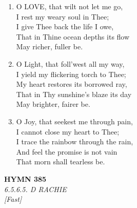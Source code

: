 \documentclass[11pt,a4paper]{article}
\begin{document}
\begin{enumerate}
    \item O LOVE, that wilt not let me go, \\
        I rest my weary soul in Thee; \\
        I give Thee back the life I owe, \\
        That in Thine ocean depths its flow \\
        May richer, fuller be.

    \item O Light, that foll'west all my way, \\
        I yield my flickering torch to Thee; \\
        My heart restores its borrowed ray, \\
        That in Thy sunshine's blaze its day \\
        May brighter, fairer be.

    \item O Joy, that seekest me through pain, \\
        I cannot close my heart to Thee; \\
        I trace the rainbow through the rain, \\
        And feel the promise is not vain \\
        That morn shall tearless be.

\end{enumerate}

\newpage
\begin{center}
    {\Large \textbf{HYMN 385}}
    \\
    \textit{6.5.6.5. D RACHIE}
    \\
    \textit{\small [Fast]}
\end{center}
\vspace{1em}
\end{document}

